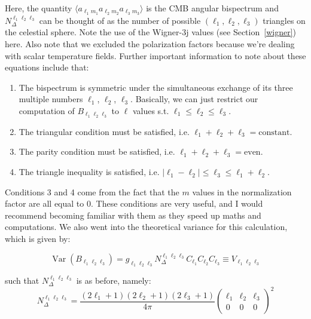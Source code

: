 \documentclass[11pt]{article}
\renewcommand{\_}[1]{\underline{ #1 }}
\newcommand{\npar}{\vspace{.3cm}\newline}
\providecommand{\abs}[1]{\lvert #1 \rvert}
\begin{document}
{Here, the quantity $\langle a_{\ell_1 m_1} a_{\ell_2 m_2} a_{\ell_3 m_3} \rangle$ is the CMB angular bispectrum and $N_{\Delta}^{\ell_1 \ell_2 \ell_3}$ can be thought of as the number of possible $(\ell_1, \ell_2, \ell_3)$ triangles on the celestial sphere. Note the use of the Wigner-3j values (see Section~\ref{wigner}) here. Also note that we excluded the polarization factors because we're dealing with scalar temperature fields. Further important information to note about these equations include that:
\begin{enumerate}
    \item The bispectrum is symmetric under the simultaneous exchange of its three multiple numbers $\ell_1$, $\ell_2$, $\ell_3$. Basically, we can just restrict our computation of $B_{\ell_1 \ell_2 \ell_3}$ to $\ell$ values s.t. $\ell_1 \leq \ell_2 \leq \ell_3$.
    \item The triangular condition must be satisfied, i.e. $\ell_1 + \ell_2 + \ell_3 = \text{constant}$.
    \item The parity condition must be satisfied, i.e. $\ell_1 + \ell_2 + \ell_3 = \text{even}$.
    \item The triangle inequality is satisfied, i.e. $\abs{\ell_1 - \ell_2} \leq \ell_3 \leq \ell_1 + \ell_2$.
\end{enumerate}

Conditions 3 and 4 come from the fact that the $m$ values in the normalization factor are all equal to $0$. These conditions are very useful, and I would recommend becoming familiar with them as they speed up maths and computations.
\npar
We also went into the theoretical variance for this calculation, which is given by:

\begin{equation}
    \operatorname{Var}\left(B_{\ell_{1} \ell_{2} \ell_{3}}\right)=g_{\ell_{1} \ell_{2} \ell_{3}} N_{\Delta}^{\ell_{1} \ell_{2} \ell_{3}} C_{\ell_{1}} C_{\ell_{2}} C_{\ell_{3}} \equiv V_{\ell_{1} \ell_{2} \ell_{3}}
\end{equation}

such that $N_{\Delta}^{\ell_1 \ell_2 \ell_3}$ is as before, namely:
\begin{equation}
    N_{\Delta}^{\ell_1\ell_2\ell_3} = \frac{(2\ell_1+1)(2\ell_2+1)(2\ell_3+1)}{4\pi} \begin{pmatrix}
        \ell_1 & \ell_2 & \ell_3 \\
        0 & 0 & 0
    \end{pmatrix}^2
\end{equation}

}
\end{document}
